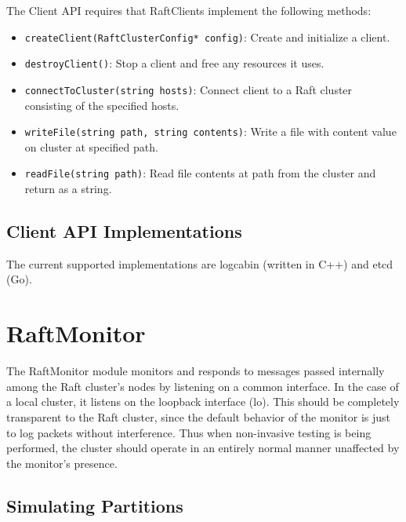 \documentclass[UTF8]{article}
\begin{document}
The Client API requires that RaftClients implement the following methods:

\begin{itemize}
\item \texttt{createClient(RaftClusterConfig* config)}: Create and initialize a client.
\item \texttt{destroyClient()}: Stop a client and free any resources it uses.
\item \texttt{connectToCluster(string hosts)}: Connect client to a Raft cluster consisting of the specified hosts.
\item \texttt{writeFile(string path, string contents)}: Write a file with content value on cluster at specified path.
\item \texttt{readFile(string path)}: Read file contents at path from the cluster and return as a string.
\end{itemize}

\subsection{Client API Implementations}

The current supported implementations are logcabin (written in C++) and etcd (Go).

\section{RaftMonitor}

The RaftMonitor module monitors and responds to messages passed internally among the Raft cluster's nodes by listening on a common interface. In the case of a local cluster, it listens on the loopback interface (lo). This should be completely transparent to the Raft cluster, since the default behavior of the monitor is just to log packets without interference. Thus when non-invasive testing is being performed, the cluster should operate in an entirely normal manner unaffected by the monitor's presence.

\subsection{Simulating Partitions}
\end{document}
